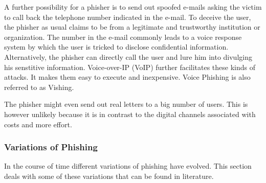 \begin{description}[leftmargin=0cm]
	\item[Voice Phishing] A further possibility for a phisher is to send out spoofed e-mails asking the victim to call back the telephone number indicated in the e-mail.
 To deceive the user, the phisher as usual claims to be from a legitimate and trustworthy institution or organization.
 The number in the e-mail commonly leads to a voice response system by which the user is tricked to disclose confidential information.
 Alternatively, the phisher can directly call the user and lure him into divulging his senstitive information.
 Voice-over-IP (VoIP) further facilitates these kinds of attacks.
 It makes them easy to execute and inexpensive.
 Voice Phishing is also referred to as Vishing.
 
	\item[Physical letters] The phisher might even send out real letters to a big number of users. This is however unlikely because it is in contrast to the digital channels associated with costs and more effort.

\end{description}

\subsubsection{Variations of Phishing}
In the course of time different variations of phishing have evolved.
 This section deals with some of these variations that can be found in literature.

\label{s:phishing_variations}

